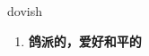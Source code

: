 
\begin{frame}
{\huge dovish}
\begin{center}
\begin{enumerate}\Large
  \item \textbf{鸽派的，爱好和平的}
\end{enumerate}
\end{center}
\end{frame}
